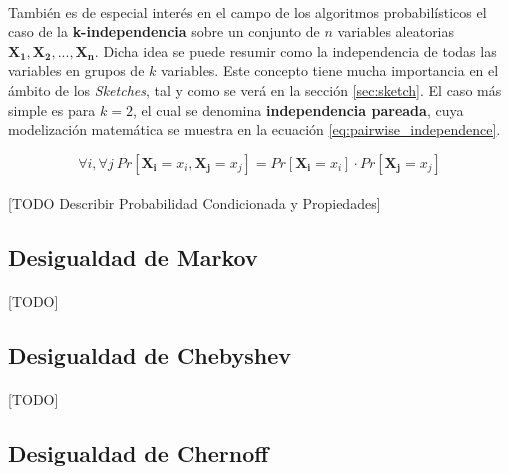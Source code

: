 \documentclass{subfiles}
\begin{document}
        \paragraph{}
        También es de especial interés en el campo de los algoritmos probabilísticos el caso de la \textbf{k-independencia} sobre un conjunto de $n$ variables aleatorias $\boldsymbol{X_1}, \boldsymbol{X_2},..., \boldsymbol{X_n}$. Dicha idea se puede resumir como la independencia de todas las variables en grupos de $k$ variables. Este concepto tiene mucha importancia en el ámbito de los \emph{Sketches}, tal y como se verá en la sección \ref{sec:sketch}. El caso más simple es para $k = 2$, el cual se denomina \textbf{independencia pareada}, cuya modelización matemática se muestra en la ecuación \eqref{eq:pairwise_independence}.

        \begin{equation}
        \label{eq:pairwise_independence}
          \forall i, \forall j \ Pr[\boldsymbol{X_i} = x_i, \boldsymbol{X_j} = x_j] = Pr[\boldsymbol{X_i} = x_i] \cdot Pr[\boldsymbol{X_j} = x_j]
        \end{equation}


        \paragraph{}
        [TODO Describir Probabilidad Condicionada y Propiedades]

      \subsection{Desigualdad de Markov}
      \label{sec:streaming_markov}

        \paragraph{}
        [TODO]

      \subsection{Desigualdad de Chebyshev}
      \label{sec:streaming_chebyshev}

        \paragraph{}
        [TODO]

      \subsection{Desigualdad de Chernoff}
      \label{sec:streaming_chernoff}
\end{document}
